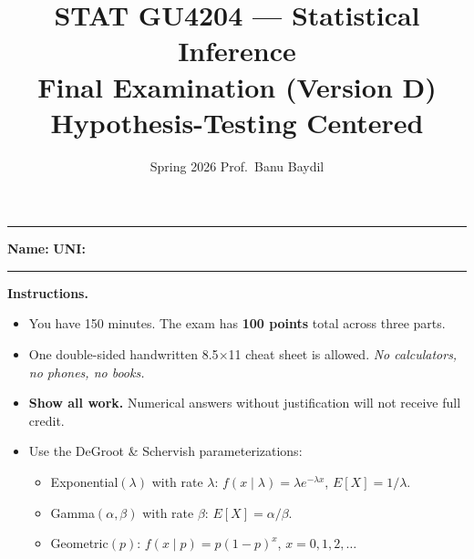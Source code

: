 \documentclass[11pt]{article}
\title{\textbf{STAT GU4204 --- Statistical Inference} \\
       \large Final Examination (Version D) \\
       \normalsize Hypothesis-Testing Centered}
\author{Spring 2026 \quad\quad Prof.\ Banu Baydil}
\date{}
\begin{document}
\maketitle

\vspace{-1.5em}

\hrule

\vspace{0.6em}

\textbf{Name:} \underline{\hspace{4in}} \quad\quad
\textbf{UNI:} \underline{\hspace{1.2in}}

\vspace{0.4em}

\hrule

\vspace{0.8em}

\textbf{Instructions.}
\begin{itemize}[leftmargin=*, itemsep=2pt, topsep=2pt]
    \item You have 150 minutes. The exam has \textbf{100 points} total across three parts.
    \item One double-sided handwritten 8.5$\times$11 cheat sheet is allowed. \emph{No calculators, no phones, no books.}
    \item \textbf{Show all work.} Numerical answers without justification will not receive full credit.
    \item Use the DeGroot \& Schervish parameterizations:
    \begin{itemize}[leftmargin=*, itemsep=0pt]
        \item Exponential$(\lambda)$ with rate $\lambda$: $f(x\mid\lambda) = \lambda e^{-\lambda x}$, $E[X] = 1/\lambda$.
        \item Gamma$(\alpha, \beta)$ with rate $\beta$: $E[X] = \alpha/\beta$.
        \item Geometric$(p)$: $f(x\mid p) = p(1-p)^x$, $x = 0, 1, 2, \dots$
    \end{itemize}
\end{itemize}
\end{document}

